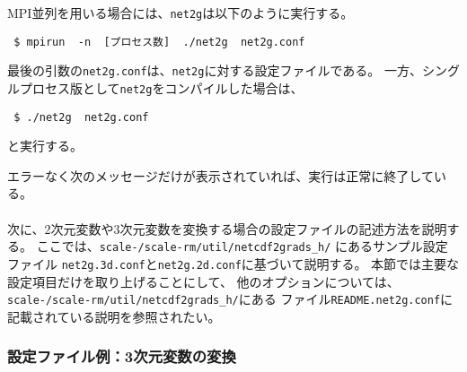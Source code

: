 MPI並列を用いる場合には、\verb|net2g|は以下のように実行する。
\begin{verbatim}
 $ mpirun  -n  [プロセス数]  ./net2g  net2g.conf
\end{verbatim}
最後の引数の\verb|net2g.conf|は、\verb|net2g|に対する設定ファイルである。
一方、シングルプロセス版として\verb|net2g|をコンパイルした場合は、
\begin{verbatim}
 $ ./net2g  net2g.conf
\end{verbatim}
と実行する。

エラーなく次のメッセージだけが表示されていれば、実行は正常に終了している。\\

\\

次に、2次元変数や3次元変数を変換する場合の設定ファイルの記述方法を説明する。
ここでは、\texttt{scale-\version/scale-rm/util/netcdf2grads\_h/} にあるサンプル設定ファイル
\verb|net2g.3d.conf|と\verb|net2g.2d.conf|に基づいて説明する。
本節では主要な設定項目だけを取り上げることにして、
他のオプションについては、\texttt{scale-\version/scale-rm/util/netcdf2grads\_h/}にある
ファイル\verb|README.net2g.conf|に記載されている説明を参照されたい。


\subsubsection{設定ファイル例：3次元変数の変換}

